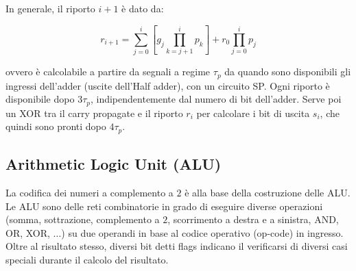 \documentclass{article}
\begin{document}
\noindent
In generale, il riporto $i+1$ è dato da:

$$
r_{i+1} = \sum^{i}_{j=0} [g_j \prod^{i}_{k=j+1} p_k] + r_0 \prod^{i}_{j=0} p_j
$$

\noindent
ovvero è calcolabile a partire da segnali a regime $\tau_p$ da quando sono disponibili gli ingressi dell'adder (uscite dell'Half adder), con un circuito SP.
Ogni riporto è disponibile dopo $3\tau_p$, indipendentemente dal numero di bit dell'adder.
Serve poi un XOR tra il carry propagate e il riporto $r_i$ per calcolare i bit di uscita $s_i$, che quindi sono pronti dopo $4\tau_p$.

\subsection{Arithmetic Logic Unit (ALU)}

La codifica dei numeri a complemento a $2$ è alla base della costruzione delle ALU.
Le ALU sono delle reti combinatorie in grado di eseguire diverse operazioni (somma, sottrazione, complemento a $2$, scorrimento a destra e a sinistra, AND, OR, XOR, $\dots$) su due operandi in base al codice operativo (op-code) in ingresso.
Oltre al risultato stesso, diversi bit detti flags indicano il verificarsi di diversi casi speciali durante il calcolo del risultato.
\end{document}
